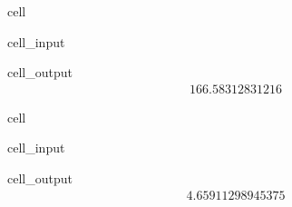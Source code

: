 \documentclass[letterpaper,10pt,english]{jupyterBook}
\begin{document}
\begin{sphinxuseclass}{cell}\begin{sphinxVerbatimInput}

\begin{sphinxuseclass}{cell_input}
\begin{sphinxVerbatim}[commandchars=\\\{\}]
\end{sphinxVerbatim}

\end{sphinxuseclass}\end{sphinxVerbatimInput}
\begin{sphinxVerbatimOutput}

\begin{sphinxuseclass}{cell_output}\begin{equation*}
\begin{split}166.58312831216\end{split}
\end{equation*}
\end{sphinxuseclass}\end{sphinxVerbatimOutput}

\end{sphinxuseclass}
\begin{sphinxuseclass}{cell}\begin{sphinxVerbatimInput}

\begin{sphinxuseclass}{cell_input}
\begin{sphinxVerbatim}[commandchars=\\\{\}]
\end{sphinxVerbatim}

\end{sphinxuseclass}\end{sphinxVerbatimInput}
\begin{sphinxVerbatimOutput}

\begin{sphinxuseclass}{cell_output}\begin{equation*}
\begin{split}4.65911298945375\end{split}
\end{equation*}
\end{sphinxuseclass}\end{sphinxVerbatimOutput}

\end{sphinxuseclass}
\end{document}
